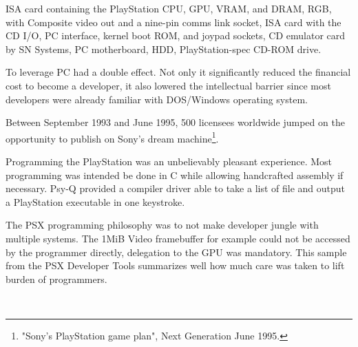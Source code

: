 \par
{} ISA card containing the PlayStation CPU, GPU, VRAM, and DRAM, RGB, with Composite video out and a nine-pin comms link socket,  ISA card with the CD I/O, PC interface, kernel boot ROM, and joypad sockets,  CD emulator card by SN Systems,  PC motherboard,  HDD,  PlayStation-spec CD-ROM drive. \\
\par
To leverage PC had a double effect. Not only it significantly reduced the financial cost to become a developer, it also lowered the intellectual barrier since most developers were already familiar with DOS/Windows operating system.\\
\par Between September 1993 and June 1995, 500 licensees worldwide jumped on the opportunity to publish on Sony's dream machine\footnote{"Sony's PlayStation game plan", Next Generation June 1995.}.







Programming the PlayStation was an unbelievably pleasant experience. Most programming was intended be done in C while allowing handcrafted assembly if necessary. Psy-Q provided a compiler driver able to take a list of file and output a PlayStation executable in one keystroke.\\
\par
The PSX programming philosophy was to not make developer jungle with multiple systems. The 1MiB Video framebuffer for example could not be accessed by the programmer directly, delegation to the GPU was mandatory. This sample from the PSX Developer Tools summarizes well how much care was taken to lift burden of programmers.\\
\par
{}\\
\par
{}
\par









